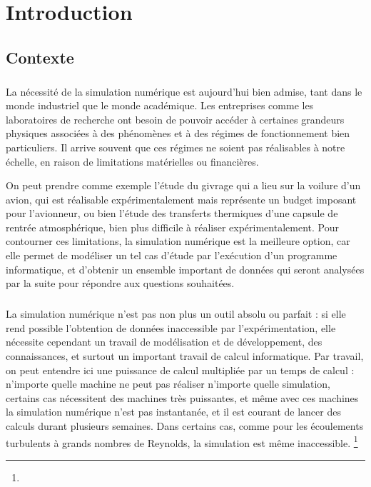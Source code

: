 \chapter{Introduction}

\section{Contexte}

	\paragraph{}
	La nécessité de la simulation numérique est aujourd'hui bien admise, tant dans le monde industriel que le monde académique.
	Les entreprises comme les laboratoires de recherche ont besoin de pouvoir accéder à certaines grandeurs physiques associées à des phénomènes et à des régimes de fonctionnement bien particuliers.
	Il arrive souvent que ces régimes ne soient pas réalisables à notre échelle, en raison de limitations matérielles ou financières.
	
	On peut prendre comme exemple l'étude du givrage qui a lieu sur la voilure d'un avion, qui est réalisable expérimentalement mais représente un budget imposant pour l’avionneur, ou bien l'étude des transferts thermiques d'une capsule de rentrée atmosphérique, bien plus difficile à réaliser expérimentalement.
	Pour contourner ces limitations, la simulation numérique est la meilleure option, car elle permet de modéliser un tel cas d'étude par l’exécution d'un programme informatique, et d'obtenir un ensemble important de données qui seront analysées par la suite pour répondre aux questions souhaitées.

	\paragraph{}
	La simulation numérique n'est pas non plus un outil absolu ou parfait : si elle rend possible l'obtention de données inaccessible par l'expérimentation, elle nécessite cependant un travail de modélisation et de développement, des connaissances, et surtout un important travail de calcul informatique.
	Par travail, on peut entendre ici une puissance de calcul multipliée par un temps de calcul : n'importe quelle machine ne peut pas réaliser n'importe quelle simulation, certains cas nécessitent des machines très puissantes, et même avec ces machines la simulation numérique n'est pas instantanée, et il est courant de lancer des calculs durant plusieurs semaines.
	Dans certains cas, comme pour les écoulements turbulents à grands nombres de Reynolds, la simulation  est même inaccessible.
	\footnote{}

